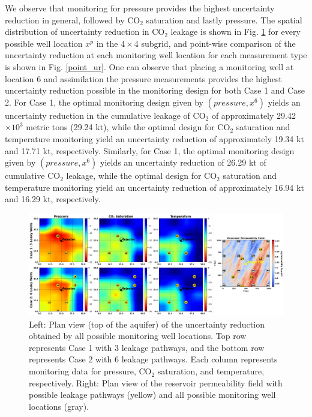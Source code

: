 \documentclass[a4paper,fleqn]{cas-sc}
\begin{document}
We observe that monitoring for pressure provides the highest uncertainty reduction in general, followed by CO$_2$ saturation and lastly pressure. The spatial distribution of uncertainty reduction in CO$_2$ leakage is shown in Fig. \ref{heatmaps} for every possible well location $x^p$ in the $4 \times 4$ subgrid, and point-wise comparison of the uncertainty reduction at each monitoring well location for each measurement type is shown in Fig. \ref{point_ur}. One can observe that placing a monitoring well at location 6 and assimilation the pressure measurements provides the highest uncertainty reduction possible in the monitoring design for both Case 1 and Case 2. For Case 1, the optimal monitoring design given by $(pressure, x^6)$ yields an uncertainty reduction in the cumulative leakage of CO$_2$ of approximately 29.42$\times 10^3$ metric tons (29.24 kt), while the optimal design for CO$_2$ saturation and temperature monitoring yield an uncertainty reduction of approximately 19.34 kt and 17.71 kt, respectively. Similarly, for Case 1, the optimal monitoring design given by $(pressure, x^6)$ yields an uncertainty reduction of 26.29 kt of cumulative CO$_2$ leakage, while the optimal design for CO$_2$ saturation and temperature monitoring yield an uncertainty reduction of approximately 16.94 kt and 16.29 kt, respectively.

\begin{figure}
    \centering
    \includegraphics[width=16.5cm]{figs/Figure 10.pdf}
    \caption{Left: Plan view (top of the aquifer) of the uncertainty reduction obtained by all possible monitoring well locations. Top row represents Case 1 with 3 leakage pathways, and the bottom row represents Case 2 with 6 leakage pathways. Each column represents monitoring data for pressure, CO$_2$ saturation, and temperature, respectively. Right: Plan view of the reservoir permeability field with possible leakage pathways (yellow) and all possible monitoring well locations (gray).}
    \label{heatmaps}
\end{figure}
\end{document}
